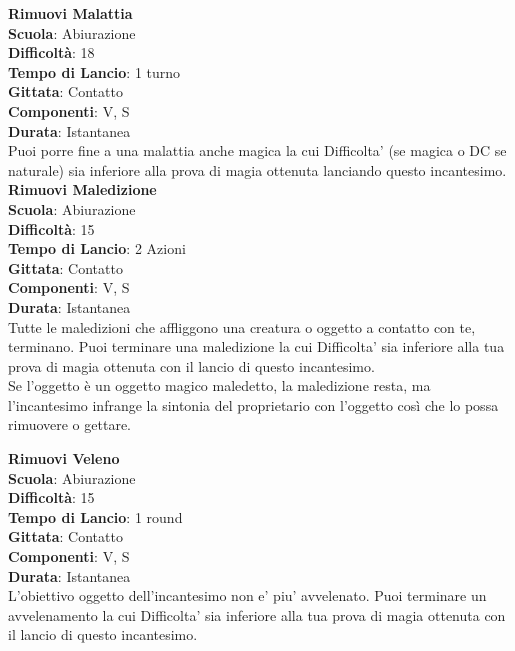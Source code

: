 \begin{multicols}{2}
\medskip\textbf{Rimuovi Malattia}\\
\textbf{Scuola}: Abiurazione\\
\textbf{Difficoltà}: 18\\
\textbf{Tempo di Lancio}: 1 turno\\
\textbf{Gittata}: Contatto\\
\textbf{Componenti}: V, S\\
\textbf{Durata}: Istantanea\\
Puoi porre fine a una malattia anche magica la cui Difficolta' (se magica o DC se naturale) sia inferiore alla prova di magia ottenuta lanciando questo incantesimo.\\

\medskip\textbf{Rimuovi Maledizione}\\
\textbf{Scuola}: Abiurazione\\
\textbf{Difficoltà}: 15\\
\textbf{Tempo di Lancio}: 2 Azioni\\
\textbf{Gittata}: Contatto\\
\textbf{Componenti}: V, S\\
\textbf{Durata}: Istantanea\\
Tutte le maledizioni che affliggono una creatura o oggetto a contatto con te, terminano. Puoi terminare una maledizione la cui Difficolta' sia inferiore alla tua prova di magia ottenuta con il lancio di questo incantesimo.\\
Se l'oggetto è un oggetto magico maledetto, la maledizione resta, ma l'incantesimo infrange la sintonia del proprietario con l'oggetto così che lo possa rimuovere o gettare.

\medskip\textbf{Rimuovi Veleno}\\
\textbf{Scuola}: Abiurazione\\
\textbf{Difficoltà}: 15\\
\textbf{Tempo di Lancio}: 1 round\\
\textbf{Gittata}: Contatto\\
\textbf{Componenti}: V, S\\
\textbf{Durata}: Istantanea\\
L'obiettivo oggetto dell'incantesimo non e' piu' avvelenato. Puoi terminare un avvelenamento la cui Difficolta' sia inferiore alla tua prova di magia ottenuta con il lancio di questo incantesimo.


\end{multicols}
